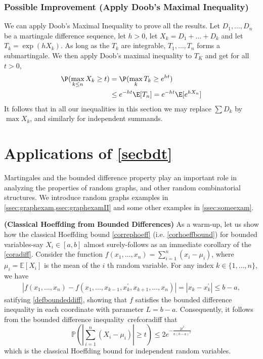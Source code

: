 \documentclass{article}
\newcommand{\bfs}[1]{\textbf{({#1})}}
\begin{document}
\subsubsection{Possible Improvement (Apply Doob's Maximal Inequality)}
We can apply Doob's Maximal Inequality \cite[p.236 Theorem 4.4.2]{durrett2019probability} to prove all the results.
Let $D_{1}, \ldots, D_{ n }$ be a martingale difference sequence, let $h >0$, let $X_{ k }= D_{1}+\ldots+ D_{ k }$ and let $T_{ k }=\exp (hX_{ k })$. As long as the $T_{ k }$ are integrable,
$T_{1}, \ldots, T _{ n }$ forms a submartingale. We then apply Doob's maximal inequality to $T_K$ and get for all $t>0$,
\begin{align*}
    \P(\max _{k\le n} X_{k} \geq t)&=\P(\max_{k} T_{k} \geq e^{h t}) \\
&\leq e^{-h t} \E[T_{n}]=e^{-h t} \E[e^{h X_{n}}]
\end{align*}
It follows that in all our inequalities in this section we may replace $\sum D_{k}$
by $\max X_{k}$, and similarly for independent summands.


\section{Applications of \cref{secbdt}}
Martingales and the bounded difference property play an important role in analyzing the properties of random graphs, and other random combinatorial structures. We introduce random graphs examples in \cref{ssec:graphexam,ssec:graphexamII} and some other examples in \cref{ssec:someexam}.

\begin{exma}{\bfs{Classical Hoeffding from Bounded Differences}}
As a warm-up, let us show how the classical Hoeffding bound \cref{correphoeff} (i.e. \cref{corhoeffbound}) for bounded variables-say $X_{i} \in[a, b]$ almost surely-follows as an immediate corollary of the \cref{coradiff}. Consider the function $f\left(x_{1}, \ldots, x_{n}\right)=\sum_{i=1}^{n}\left(x_{i}-\mu_{i}\right)$, where $\mu_{i}=\mathbb{E}\left[X_{i}\right]$ is the mean of the $i$ th random variable. For any index $k \in\{1, \ldots, n\}$, we have
\begin{align*}
\left|f\left(x_{1}, \ldots, x_{n}\right)-f\left(x_{1}, \ldots, x_{k-1}, x_{k}^{\prime}, x_{k+1}, \ldots, x_{n}\right)\right| =\left|x_{k}-x_{k}^{\prime}\right| \leq b-a,
\end{align*}
satifying \cref{defboundeddiff},
showing that $f$ satisfies the bounded difference inequality in each coordinate with parameter $L=b-a$. Consequently, it follows from the bounded difference inequality\ cref{coradiff} that
$$
\mathbb{P}\left(\left|\sum_{i=1}^{n}\left(X_{i}-\mu_{i}\right)\right| \geq t\right) \leq 2 e^{-\frac{2t^{2}}{n(b-a)^{2}}}
$$
which is the classical Hoeffding bound for independent random variables.
\end{exma}
\end{document}

